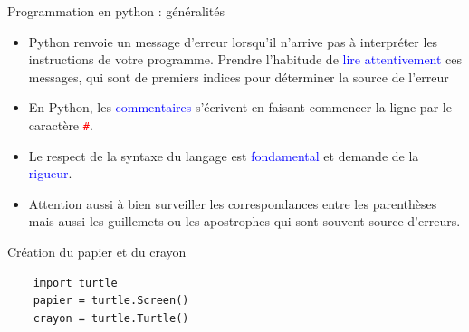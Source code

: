 \documentclass[10pt]{beamer}
\begin{document}
\begin{frame}[fragile]
	\mframe{\Python}
	\begin{block}{Programmation en python : généralités}
		\begin{itemize}
			\item<1-> Python renvoie un message d'erreur lorsqu'il n'arrive pas à interpréter les instructions de votre programme. Prendre l'habitude de \textcolor{blue}{lire attentivement} ces messages, qui sont de premiers indices pour déterminer la source de l'erreur
			\item<2-> En Python, les \textcolor{blue}{commentaires} s'écrivent en faisant commencer la ligne par le caractère \textcolor{red}{\tt \#}.
			\item<3-> Le respect de la syntaxe du langage est \textcolor{blue}{fondamental} et demande de la \textcolor{blue}{rigueur}.
			\item<4-> Attention aussi à bien surveiller les correspondances entre les parenthèses mais aussi les guillemets ou les apostrophes qui sont souvent source d'erreurs.
		\end{itemize}
	\end{block}
\end{frame}

\begin{frame}[fragile]
	\mframe{\Python}
	\begin{block}{Création du papier et du crayon}
		\begin{lstlisting}
	import turtle
	papier = turtle.Screen()
	crayon = turtle.Turtle()
		\end{lstlisting}
	\end{block}
\end{frame}
\end{document}
